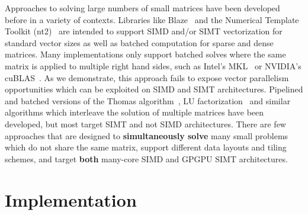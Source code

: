 \documentclass[10pt, conference, compsocconf]{IEEEtran}
\begin{document}
Approaches to solving large numbers of small matrices have been 
  developed before in a variety of contexts.
Libraries like Blaze~\cite{blaze_git} and the Numerical Template Toolkit
  (nt2)~\cite{nt2_git} are intended to support SIMD and/or SIMT vectorization
  for standard vector sizes as well as batched computation for sparse and dense
  matrices.
Many implementations only support batched solves where the same matrix is
  applied to multiple right hand sides, such as Intel's MKL~\cite{mkl} or
  NVIDIA's cuBLAS~\cite{cublas}.
As we demonstrate, this approach fails to expose vector parallelism
  opportunities which can be exploited on SIMD and SIMT architectures.
Pipelined and batched versions of the Thomas
  algorithm~\cite{pipelined_thomas_algorithm}, LU
  factorization~\cite{batched_lu_haidar} and similar algorithms which 
  interleave the solution of multiple matrices have been developed, but most
  target SIMT and not SIMD architectures.
There are few approaches that are designed to \textbf{simultaneously solve}
  many small problems which do not share the same matrix, support different
  data layouts and tiling schemes, and target \textbf{both} many-core SIMD and
  GPGPU SIMT architectures.

\section{Implementation}
\label{sec:impl}
\end{document}
